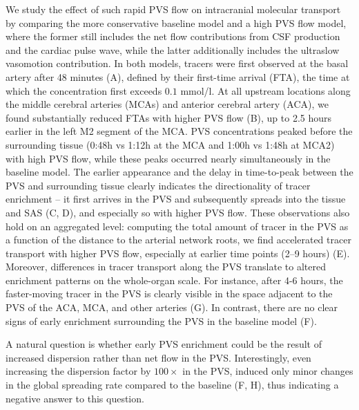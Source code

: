 \documentclass[fleqn,10pt]{wlscirep}
\begin{document}
We study the effect of such rapid PVS flow on intracranial molecular
transport by comparing the more conservative baseline model and a
high PVS flow model, where the former still includes the net flow
contributions from CSF production and the cardiac pulse wave, while
the latter additionally includes the ultraslow vasomotion
contribution. In both models, tracers were first observed at the basal
artery after 48 minutes (A), defined by their first-time arrival (FTA), the time at which the concentration first exceeds $0.1$ mmol/l. At all upstream locations along the middle cerebral arteries
(MCAs) and anterior cerebral artery (ACA), we found substantially
reduced FTAs with higher PVS flow (B), up to 2.5 hours
earlier in the left M2 segment of the MCA. PVS concentrations peaked
before the surrounding tissue (0:48h vs 1:12h at the MCA and 1:00h vs
1:48h at MCA2) with high PVS flow, while these peaks occurred nearly
simultaneously in the baseline model. The earlier appearance and the
delay in time-to-peak between the PVS and surrounding tissue clearly
indicates the directionality of tracer enrichment -- it first arrives
in the PVS and subsequently spreads into the tissue and SAS
(C, D), and especially so with higher PVS flow. These
observations also hold on an aggregated level: computing the total
amount of tracer in the PVS as a function of the distance to the
arterial network roots, we find accelerated tracer transport with
higher PVS flow, especially at earlier time points (2--9 hours)
(E). Moreover, differences in tracer transport along the
PVS translate to altered enrichment patterns on the whole-organ
scale. For instance, after 4-6 hours, the faster-moving tracer in the
PVS is clearly visible in the space adjacent to the PVS of the ACA, MCA, and other arteries (G). In contrast,
there are no clear signs of early enrichment surrounding the PVS in
the baseline model (F).

A natural question is whether early PVS enrichment could be the result
of increased dispersion rather than net flow in the
PVS\cite{asgari2016glymphatic,sharp2019dispersion,bojarskaite2023sleep,asgari2016glymphatic,troyetsky2021dispersion}. Interestingly,
even increasing the dispersion factor by $100 \times$ in the PVS,
induced only minor changes in the global spreading rate compared to the
baseline (F, H), thus indicating a negative answer to
this question.
\end{document}
